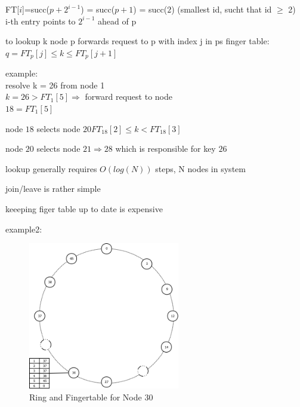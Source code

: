 \documentclass[ngerman,a4paper]{report}
\begin{document}
\begin{compactitem}
FT[$i$]=succ($p+2^{i-1}$) = succ($p+1$) = succ($2$) (smallest id, sucht that id $\geq$ 2)\\
i-th entry points to $2^{i-1}$ ahead of p
\item to lookup k node p forwards request to p with index j in ps finger table:\\
$q = FT_p[j] \leq k \leq FT_p[j+1]$
\item example:\\
resolve k = 26 from node 1 \\
$k=26 > FT_1[5] \Rightarrow$ forward request to node\\
$18 = FT_1[5]$
\begin{compactitem}
\item node $18$ selects node $20 FT_{18}[2] \leq k < FT_{18}[3]$\\
\item node $20$ selects node $21 \Rightarrow 28 $ which is responsible for key $26$\\
\item lookup generally requires $O(log(N))$ steps, N nodes in system
\item join/leave is rather simple
\item keeeping figer table up to date is expensive
\end{compactitem}
\item example2:\\
\begin{figure}[h]
	\centering
	\includegraphics[width=250px]{gfx/Chord_Fingertable.png}
	\caption{Ring and Fingertable for Node 30}
	\label{img:ring}
\end{figure}

\end{compactitem}
\end{document}
